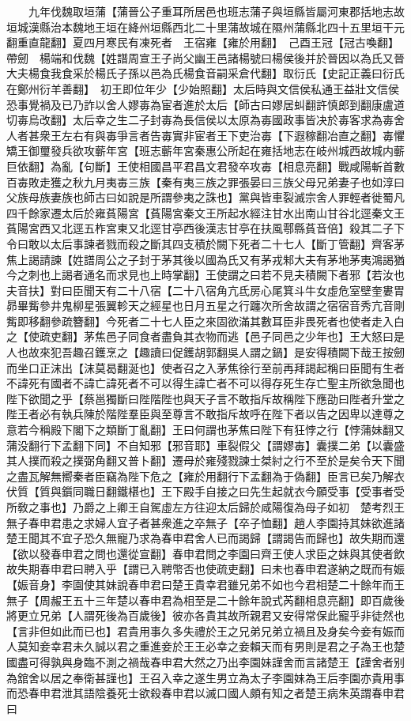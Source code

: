 　　九年伐魏取垣蒲【蒲晉公子重耳所居邑也班志蒲子與垣縣皆屬河東郡括地志故垣城漢縣治本魏地王垣在絳州垣縣西北二十里蒲故城在隰州蒲縣北四十五里垣干元翻重直龍翻】夏四月寒民有凍死者　王宿雍【雍於用翻】　己酉王冠【冠古喚翻】帶劒　楊端和伐魏【姓譜周宣王子尚父幽王邑諸楊號曰楊侯後并於晉因以為氏又晉大夫楊食我食采於楊氏子孫以邑為氏楊食音嗣采倉代翻】取衍氏【史記正義曰衍氏在鄭州衍羊善翻】　初王即位年少【少始照翻】太后時與文信侯私通王益壯文信侯恐事覺禍及已乃詐以舍人嫪毐為宦者進於太后【師古曰嫪居虯翻許慎郎到翻康盧道切毐烏改翻】太后幸之生二子封毐為長信侯以太原為毐國政事皆决於毐客求為毐舍人者甚衆王左右有與毐爭言者告毐實非宦者王下吏治毐【下遐稼翻冶直之翻】毐懼矯王御璽發兵欲攻蘄年宮【班志蘄年宮秦惠公所起在雍括地志在岐州城西故城内蘄巨依翻】為亂【句斷】王使相國昌平君昌文君發卒攻毐【相息亮翻】戰咸陽斬首數百毐敗走獲之秋九月夷毐三族【秦有夷三族之罪張晏曰三族父母兄弟妻子也如淳曰父族母族妻族也師古曰如說是所謂參夷之誅也】黨與皆車裂滅宗舍人罪輕者徙蜀凡四千餘家遷太后於雍萯陽宮【萯陽宮秦文王所起水經注甘水出南山甘谷北逕秦文王萯陽宮西又北逕五柞宮東又北逕甘亭西後漢志甘亭在扶風鄠縣萯音倍】殺其二子下令曰敢以太后事諫者戮而殺之斷其四支積於闕下死者二十七人【斷丁管翻】齊客茅焦上謁請諫【姓譜周公之子封于茅其後以國為氏又有茅戎邾大夫有茅地茅夷鴻謁猶今之刺也上謁者通名而求見也上時掌翻】王使謂之曰若不見夫積闕下者邪【若汝也夫音扶】對曰臣聞天有二十八宿【二十八宿角亢氐房心尾箕斗牛女虛危室壁奎婁胃昴畢觜參井鬼柳星張翼軫天之經星也日月五星之行躔次所舍故謂之宿宿音秀亢音剛觜即移翻參疏簪翻】今死者二十七人臣之來固欲滿其數耳臣非畏死者也使者走入白之【使疏吏翻】茅焦邑子同食者盡負其衣物而逃【邑子同邑之少年也】王大怒曰是人也故來犯吾趣召鑊烹之【趣讀曰促鑊胡郭翻吳人謂之鍋】是安得積闕下哉王按劒而坐口正沫出【沫莫曷翻涎也】使者召之入茅焦徐行至前再拜謁起稱曰臣聞有生者不諱死有國者不諱亡諱死者不可以得生諱亡者不可以得存死生存亡聖主所欲急聞也陛下欲聞之乎【蔡邕獨斷曰陛階陛也與天子言不敢指斥故稱陛下應劭曰陛者升堂之陛王者必有執兵陳於階陛羣臣與至尊言不敢指斥故呼在陛下者以告之因卑以達尊之意若今稱殿下閣下之類斷丁亂翻】王曰何謂也茅焦曰陛下有狂悖之行【悖蒲妹翻又蒲没翻行下孟翻下同】不自知邪【邪音耶】車裂假父【謂嫪毐】囊撲二弟【以囊盛其人撲而殺之撲弼角翻又普卜翻】遷母於雍殘戮諫士桀紂之行不至於是矣令天下聞之盡瓦解無嚮秦者臣竊為陛下危之【雍於用翻行下孟翻為于偽翻】臣言已矣乃解衣伏質【質與鑕同職日翻鐵椹也】王下殿手自接之曰先生起就衣今願受事【受事者受所敎之事也】乃爵之上卿王自駕虛左方往迎太后歸於咸陽復為母子如初　楚考烈王無子春申君患之求婦人宜子者甚衆進之卒無子【卒子恤翻】趙人李園持其妹欲進諸楚王聞其不宜子恐久無寵乃求為春申君舍人已而謁歸【謂謁告而歸也】故失期而還【欲以發春申君之問也還從宣翻】春申君問之李園曰齊王使人求臣之妹與其使者飲故失期春申君曰聘入乎【謂已入聘幣否也使疏吏翻】曰未也春申君遂納之既而有娠【娠音身】李園使其妹說春申君曰楚王貴幸君雖兄弟不如也今君相楚二十餘年而王無子【周赧王五十三年楚以春申君為相至是二十餘年說式芮翻相息亮翻】即百歲後將更立兄弟【人謂死後為百歲後】彼亦各貴其故所親君又安得常保此寵乎非徒然也【言非但如此而已也】君貴用事久多失禮於王之兄弟兄弟立禍且及身矣今妾有娠而人莫知妾幸君未久誠以君之重進妾於王王必幸之妾賴天而有男則是君之子為王也楚國盡可得孰與身臨不測之禍哉春申君大然之乃出李園妹謹舍而言諸楚王【謹舍者别為舘舍以居之奉衛甚謹也】王召入幸之遂生男立為太子李園妹為王后李園亦貴用事而恐春申君泄其語陰養死士欲殺春申君以滅口國人頗有知之者楚王病朱英謂春申君曰